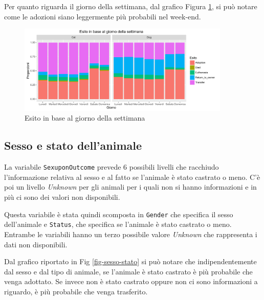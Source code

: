 Per quanto riguarda il giorno della settimana, dal grafico Figura \ref{fig-dow}, si può notare come le adozioni siano leggermente più probabili nel week-end.

\begin{figure}[htbp]
	\centering
	\includegraphics[width=0.9\textwidth]{./grafici/esito_week.pdf}
	\caption{Esito in base al giorno della settimana}\label{fig-dow}
\end{figure}

\subsection{Sesso e stato dell'animale}

La variabile \texttt{SexuponOutcome} prevede 6 possibili livelli che racchiudo l'informazione relativa al sesso e al fatto se l'animale è stato castrato o meno. C'è poi un livello \textit{Unknown} per gli animali per i quali non si hanno informazioni e in più ci sono dei valori non disponibili.

Questa variabile è stata quindi scomposta in \texttt{Gender} che specifica il sesso dell'animale e \texttt{Status}, che specifica se l'animale è stato castrato o meno. Entrambe le variabili hanno un terzo possibile valore \textit{Unknown} che rappresenta i dati non disponibili.

Dal grafico riportato in Fig \ref{fig-sesso-stato} si può notare che indipendentemente dal sesso e dal tipo di animale, se l'animale è stato castrato è più probabile che venga adottato. Se invece non è stato castrato oppure non ci sono informazioni a riguardo, è più probabile che venga trasferito.

